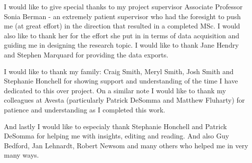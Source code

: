 I would like to give special thanks to my project supervisor Associate Professor Sonia Berman - an extremely patient supervisor who had the foresight to push me (at great effort) in the direction that resulted in a completed MSc. I would also like to thank her for the effort she put in in terms of data acquisition and guiding me in designing the research topic. I would like to thank Jane Hendry and Stephen Marquard for providing the data exports.

I would like to thank my family: Craig Smith, Meryl Smith, Josh Smith and Stephanie Honchell for showing support and understanding of the time I have dedicated to this over project. On a similar note I would like to thank my colleagues at Avesta (particularly Patrick DeSomma and Matthew Fluharty) for patience and understanding as I completed this work.

And lastly I would like to especialy thank Stephanie Honchell and Patrick DeSomma for helping me with insights, editing and reading. And also Guy Bedford, Jan Lehnardt, Robert Newsom and many others who helped me in very many ways.